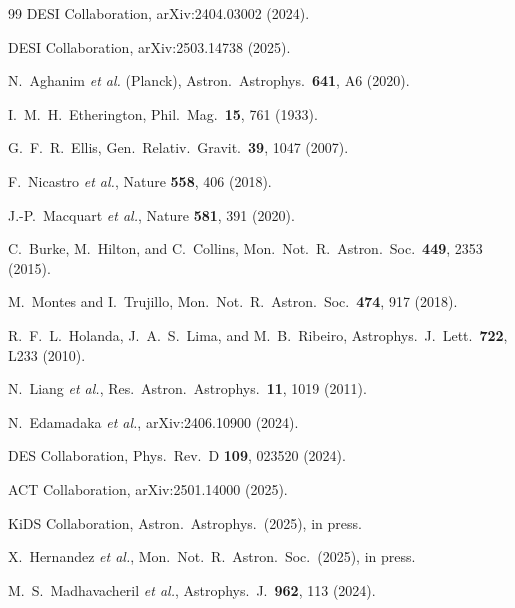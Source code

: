 \documentclass[aps,prd,twocolumn,superscriptaddress,nofootinbib]{revtex4-2}
\begin{document}
\begin{thebibliography}{99}
DESI Collaboration,
arXiv:2404.03002 (2024).

DESI Collaboration,
arXiv:2503.14738 (2025).

N.~Aghanim \textit{et al.} (Planck),
Astron.\ Astrophys.\ \textbf{641}, A6 (2020).

I.~M.~H.~Etherington,
Phil.\ Mag.\ \textbf{15}, 761 (1933).

G.~F.~R.~Ellis,
Gen.\ Relativ.\ Gravit.\ \textbf{39}, 1047 (2007).

F.~Nicastro \textit{et al.},
Nature \textbf{558}, 406 (2018).

J.-P.~Macquart \textit{et al.},
Nature \textbf{581}, 391 (2020).

C.~Burke, M.~Hilton, and C.~Collins,
Mon.\ Not.\ R.\ Astron.\ Soc.\ \textbf{449}, 2353 (2015).

M.~Montes and I.~Trujillo,
Mon.\ Not.\ R.\ Astron.\ Soc.\ \textbf{474}, 917 (2018).

R.~F.~L.~Holanda, J.~A.~S.~Lima, and M.~B.~Ribeiro,
Astrophys.\ J.\ Lett.\ \textbf{722}, L233 (2010).

N.~Liang \textit{et al.},
Res.\ Astron.\ Astrophys.\ \textbf{11}, 1019 (2011).

N.~Edamadaka \textit{et al.},
arXiv:2406.10900 (2024).

DES Collaboration,
Phys.\ Rev.\ D \textbf{109}, 023520 (2024).

ACT Collaboration,
arXiv:2501.14000 (2025).

KiDS Collaboration,
Astron.\ Astrophys.\ (2025), in press.

X.~Hernandez \textit{et al.},
Mon.\ Not.\ R.\ Astron.\ Soc.\ (2025), in press.

M.~S.~Madhavacheril \textit{et al.},
Astrophys.\ J.\ \textbf{962}, 113 (2024).

\end{thebibliography}
\end{document}
